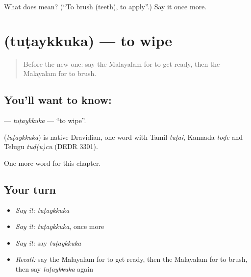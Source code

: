 \begin{tcolorbox}[breakable,colback=teal!4,colframe=teal!35!black,title={Before you move on}]
What does  mean? (\textquotedblleft{}To brush (teeth), to apply\textquotedblright{}.) Say it once more.
\end{tcolorbox}
\section[\texorpdfstring{\ml{തുടയ്ക്കുക} (tuṭaykkuka)}{തുടയ്ക്കുക (tuṭaykkuka)}]{ (tuṭaykkuka) — to wipe}

\label{lesson:ML-C264-tutaykkuka}



\begin{quote}
Before the new one: say the Malayalam for to get ready, then the Malayalam for to brush.
\end{quote}

\subsection*{You'll want to know: }
\textbf{} — \emph{tuṭaykkuka} — \textquotedblleft{}to wipe\textquotedblright{}.

\begin{cousinweb}
\textbf{} (\emph{tuṭaykkuka}) is native Dravidian, one word with Tamil \emph{tuṭai}, Kannada \emph{toḍe} and Telugu \emph{tuḍ(u)cu} (DEDR 3301).
\end{cousinweb}

\begin{grammarlens}[title={What you've built}]
One more word for this chapter.
\end{grammarlens}

\subsection*{Your turn}
\begin{itemize}
\raggedright
  \item \emph{Say it:} \emph{tuṭaykkuka}
  \item \emph{Say it:} \emph{tuṭaykkuka}, once more
  \item \emph{Say it:} say \emph{tuṭaykkuka}
  \item \emph{Recall:} say the Malayalam for to get ready, then the Malayalam for to brush, then say \emph{tuṭaykkuka} again
\end{itemize}

